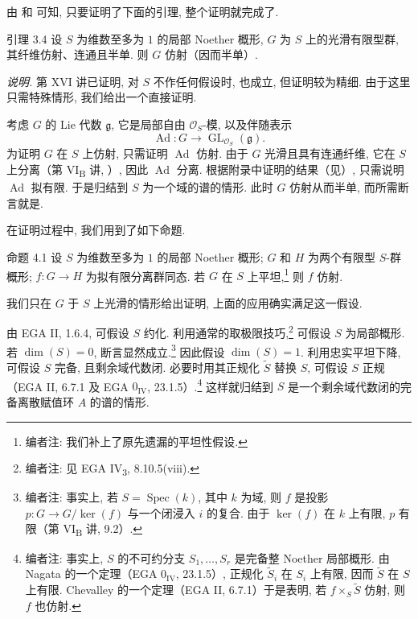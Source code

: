 由 和 可知, 只要证明了下面的引理, 整个证明就完成了.

\begin{sgastatement}{引理 3.4}
设 \(S\) 为维数至多为 \(1\) 的局部 Noether 概形, \(G\) 为 \(S\) 上的光滑有限型群, 其纤维仿射、连通且半单. 则 \(G\) 仿射（因而半单）.
\end{sgastatement}

\noindent\textit{说明.}\quad
第 XVI 讲已证明, 对 \(S\) 不作任何假设时,  也成立, 但证明较为精细. 由于这里只需特殊情形, 我们给出一个直接证明.

考虑 \(G\) 的 Lie 代数 \(\mathfrak g\), 它是局部自由 \(\mathcal O_S\)-模, 以及伴随表示
\[
 \operatorname{Ad}\colon
 G\longrightarrow\operatorname{GL}_{\mathcal O_S}(\mathfrak g).
\]
为证明 \(G\) 在 \(S\) 上仿射, 只需证明 \(\operatorname{Ad}\) 仿射. 由于 \(G\) 光滑且具有连通纤维, 它在 \(S\) 上分离（第 VI\textsubscript{B} 讲, ）, 因此 \(\operatorname{Ad}\) 分离. 根据附录中证明的结果（见）, 只需说明 \(\operatorname{Ad}\) 拟有限. 于是归结到 \(S\) 为一个域的谱的情形. 此时 \(G\) 仿射从而半单, 而所需断言就是.


在证明过程中, 我们用到了如下命题.

\begin{sgastatement}{命题 4.1}
设 \(S\) 为维数至多为 \(1\) 的局部 Noether 概形; \(G\) 和 \(H\) 为两个有限型 \(S\)-群概形; \(f\colon G\to H\) 为拟有限分离群同态. 若 \(G\) 在 \(S\) 上平坦,\footnote{编者注: 我们补上了原先遗漏的平坦性假设.} 则 \(f\) 仿射.
\end{sgastatement}

我们只在 \(G\) 于 \(S\) 上光滑的情形给出证明, 上面的应用确实满足这一假设.


由 EGA II, 1.6.4, 可假设 \(S\) 约化. 利用通常的取极限技巧,\footnote{编者注: 见 EGA IV\textsubscript{3}, 8.10.5(viii).} 可假设 \(S\) 为局部概形. 若 \(\dim(S)=0\), 断言显然成立.\footnote{编者注: 事实上, 若 \(S=\operatorname{Spec}(k)\), 其中 \(k\) 为域, 则 \(f\) 是投影 \(p\colon G\to G/\ker(f)\) 与一个闭浸入 \(i\) 的复合. 由于 \(\ker(f)\) 在 \(k\) 上有限, \(p\) 有限（第 VI\textsubscript{B} 讲, 9.2）.}
因此假设 \(\dim(S)=1\). 利用忠实平坦下降, 可假设 \(S\) 完备, 且剩余域代数闭. 必要时用其正规化 \(\widetilde S\) 替换 \(S\), 可假设 \(S\) 正规（EGA II, 6.7.1 及 EGA \(0_{\mathrm{IV}}\), 23.1.5）.\footnote{编者注: 事实上, \(S\) 的不可约分支 \(S_1,\ldots,S_r\) 是完备整 Noether 局部概形. 由 Nagata 的一个定理（EGA \(0_{\mathrm{IV}}\), 23.1.5）, 正规化 \(\widetilde S_i\) 在 \(S_i\) 上有限, 因而 \(\widetilde S\) 在 \(S\) 上有限. Chevalley 的一个定理（EGA II, 6.7.1）于是表明, 若 \(f\times_S\widetilde S\) 仿射, 则 \(f\) 也仿射.}
这样就归结到 \(S\) 是一个剩余域代数闭的完备离散赋值环 \(A\) 的谱的情形.

